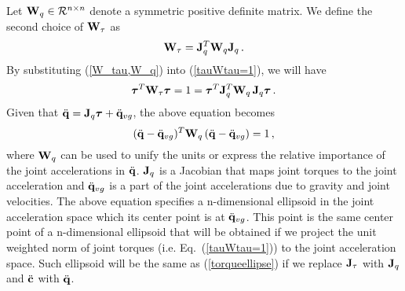 Let $\mathbf{W}_q \in \mathcal{R}^{n \times n}$ denote a symmetric positive definite matrix.
We define the second choice of $\mathbf{W}_\tau$ as
%
\begin{equation}
\mathbf{W}_\tau = \mathbf{J}_q^T \mathbf{W}_q \mathbf{J}_q \, .
\label{W_tau,W_q}
\end{equation}
%
By substituting (\ref{W_tau,W_q}) into (\ref{tauWtau=1}), we will have
%
\begin{equation}
\boldsymbol{\tau}^T \mathbf{W}_\tau \boldsymbol{\tau} = 1 = \boldsymbol{\tau}^T \mathbf{J}_q^T \mathbf{W}_q \, \mathbf{J}_q \boldsymbol{\tau} \, .
\end{equation}
%
Given that $\ddot{\mathbf{q}} = \mathbf{J}_q \boldsymbol{\tau} + \ddot{\mathbf{q}}_{vg}$, the above equation
becomes
%
\begin{equation}
(\ddot{\mathbf{q}}-\ddot{\mathbf{q}}_{vg})^T \mathbf{W}_q \, (\ddot{\mathbf{q}}-\ddot{\mathbf{q}}_{vg}) = 1 \,
,
\label{qddTWqdd=1}
\end{equation}
%
where $\mathbf{W}_q$ can be used to unify the units or express the relative
importance of the joint accelerations in $\ddot{\mathbf{q}}$.  $\mathbf{J}_q$ is a Jacobian
that maps joint torques to the joint acceleration and $\ddot{\mathbf{q}}_{vg}$ is a
part of the joint accelerations due to gravity and joint velocities.  The
above equation specifies a n-dimensional ellipsoid in the joint acceleration
space which its center point is at $\ddot{\mathbf{q}}_{vg}$.  This point is the same
center point of a n-dimensional ellipsoid that will be obtained if we project
the unit weighted norm of joint torques (i.e. Eq.~(\ref{tauWtau=1})) to the
joint acceleration space.  Such ellipsoid will be the same as
(\ref{torqueellipse}) if we replace $\mathbf{J}_\tau$ with $\mathbf{J}_q$ and $\ddot{\mathbf{c}}$
with $\ddot{\mathbf{q}}$.

